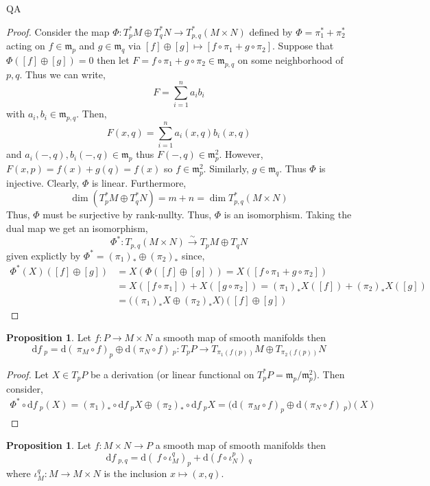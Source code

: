QA	 \documentclass[12pt]{extarticle}
\renewcommand{\d}[1]{ \mathrm{d}#1 \:}
\theoremstyle{definition}
\newtheorem{proposition}[theorem]{Proposition}
\newcommand{\m}{\mathfrak{m}}
\begin{document}
\begin{proof}
Consider the map $\Phi : T_p^* M \oplus T_q^* N \to T_{p,q}^* (M \times N)$ defined by $\Phi = \pi_1^* + \pi_2^*$ acting on $f \in \m_p$ and $g \in \m_q$ via $[f] \oplus [g] \mapsto [f \circ \pi_1 + g \circ \pi_2 ]$.
Suppose that $\Phi([f] \oplus [g]) = 0$ then let $F = f \circ \pi_1 + g \circ \pi_2 \in \m_{p,q}$ on some neighborhood of $p,q$. Thus we can write,
\[ F = \sum_{i = 1}^n a_i b_i \]
with $a_i, b_i \in \m_{p,q}$. Then, 
\[ F(x, q) = \sum_{i = 1}^n a_i(x, q) b_i(x, q) \]
and $a_i(-,q), b_i(-,q) \in \m_p$ thus $F(-,q) \in \m_p^2$.
However, $F(x,p) = f(x) + g(q) = f(x)$ so $f \in \m_p^2$. Similarly, $g \in \m_q$. Thus $\Phi$ is injective. Clearly, $\Phi$ is linear. Furthermore, 
\[ \dim{(T_p^* M \oplus T_q^* N)} = m + n = \dim{T_{p,q}^* (M \times N)} \]
Thus, $\Phi$ must be surjective by rank-nullty. Thus, $\Phi$ is an isomorphism. Taking the dual map we get an isomorphism,
\[ \Phi^* : T_{p,q} (M \times N) \xrightarrow{\sim} T_p M \oplus T_q N \]
given explictly by $\Phi^* = (\pi_1)_* \oplus (\pi_2)_*$ since, 
\begin{align*}
\Phi^*(X)([f]\oplus[g]) & = X(\Phi([f] \oplus [g])) = X([f \circ \pi_1 + g \circ \pi_2]) 
\\
& = X([f \circ \pi_1]) + X([g \circ \pi_2]) = (\pi_1)_* X([f]) + (\pi_2)_* X([g])
\\
& = \Big( (\pi_1)_* X \oplus (\pi_2)_* X \Big) ([f] \oplus [g])
\end{align*}
\end{proof}

\begin{proposition}
Let $f : P \to M \times N$ a smooth map of smooth manifolds then 
\[ \d{f}_p = \d(\pi_M \circ f)_p \oplus \d{(\pi_N \circ f)}_p : T_p P \to T_{\pi_1(f(p))} M \oplus T_{\pi_2(f(p))} N \]
\end{proposition}

\begin{proof}
Let $X \in T_p P$ be a derivation (or linear functional on $T_p^* P = \m_p / \m_p^2$). Then consider,
\begin{align*}
\Phi^* \circ \d{f}_p(X) = (\pi_1)_* \circ \d{f}_p X \oplus (\pi_2)_* \circ \d{f}_p X = \Big( \d(\pi_M \circ f)_p \oplus \d{(\pi_N \circ f)}_p \Big)(X)
\end{align*}
\end{proof}

\begin{proposition}
Let $f : M \times N \to P$ a smooth map of smooth manifolds then 
\[ \d{f}_{p,q} = \d(f \circ \iota_M^q)_p + \d{(f \circ \iota_N^p)}_q \]
where $\iota_M^q : M \to M \times N$ is the inclusion $x \mapsto (x, q)$. 
\end{proposition}
\end{document}
